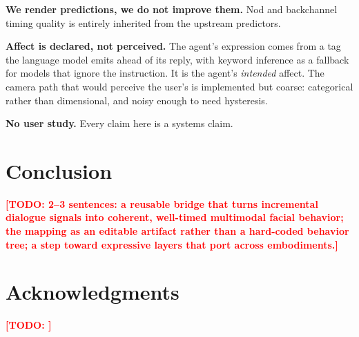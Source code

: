\documentclass[conference]{IEEEtran}
\newcommand{\todo}[1]{\textcolor{red}{\textbf{[TODO: #1]}}}
\begin{document}
\textbf{We render predictions, we do not improve them.} Nod and backchannel
timing quality is entirely inherited from the upstream predictors.

\textbf{Affect is declared, not perceived.} The agent's expression comes from a
tag the language model emits ahead of its reply, with keyword inference as a
fallback for models that ignore the instruction. It is the agent's
\emph{intended} affect. The camera path that would perceive the user's is
implemented but coarse: categorical rather than dimensional, and noisy enough to
need hysteresis.

\textbf{No user study.} Every claim here is a systems claim.

\section{Conclusion}

\todo{2--3 sentences: a reusable bridge that turns incremental dialogue signals
into coherent, well-timed multimodal facial behavior; the mapping as an editable
artifact rather than a hard-coded behavior tree; a step toward expressive
layers that port across embodiments.}

\section*{Acknowledgments}
\todo{}



\end{document}
